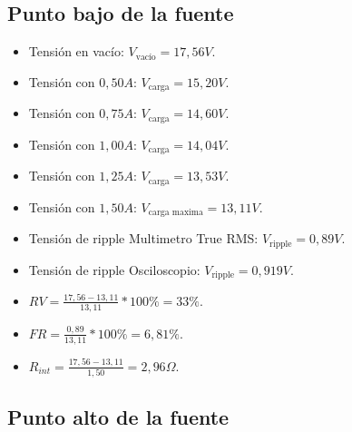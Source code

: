     \subsection{Punto bajo de la fuente}


    \begin{itemize}
        \item Tensión en vacío: $V_{\text{vacío}} = 17,56 V$.
        \item Tensión con $0,50 A$: $V_{\text{carga}} = 15,20 V$.
        \item Tensión con $0,75 A$: $V_{\text{carga}} = 14,60 V$.
        \item Tensión con $1,00 A$: $V_{\text{carga}} = 14,04 V$.
        \item Tensión con $1,25 A$: $V_{\text{carga}} = 13,53 V$.
        \item Tensión con $1,50 A$: $V_{\text{carga maxima}} = 13,11 V$.
        \item Tensión de ripple Multimetro True RMS: $V_{\text{ripple}} = 0,89 V$. 
        \item Tensión de ripple Osciloscopio: $V_{\text{ripple}} = 0,919 V$.
    \end{itemize}

    \columnbreak
    \text{}
    
    \begin{itemize}
        \item $RV = \frac{17,56 - 13,11}{13,11} * 100\% = 33\%$.
        \item $FR = \frac{0,89}{13,11} * 100\% = 6,81\%$.
        \item $R_{int} = \frac{17,56 - 13,11}{1,50} = 2,96 \Omega$.
    \end{itemize}

    \subsection{Punto alto de la fuente}
    

